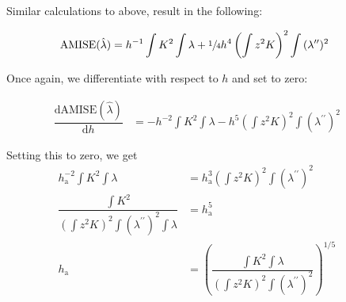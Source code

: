 Similar calculations to above, result in the following:

\begin{align}
\mbox{AMISE}(\hat{\lambda}) & = h^{-1} \int{K^2}\int{\lambda} + \sfrac{1}{4}h^4\left(\int{z^2K}\right)^2 \int{ (\lambda^{\prime\prime})^2 } && \label{eq:AMISE_I}
\end{align}

Once again, we differentiate with respect to $h$ and set to zero:

\begin{align}
\dfrac{\mathrm{d}\mbox{AMISE}(\hat{\lambda})}{\mathrm{d}h} & = - h^{-2} \int{K^2}\int{\lambda} - h^5\left(\int{z^2K}\right)^2 \int{ (\lambda^{\prime\prime})^2 } &&
\end{align}

Setting this to zero, we get 
\begin{align}
h_{\mbox{a}}^{-2} \int{K^2} \int{\lambda} & = h_{\mbox{a}}^3 \left(\int{z^2K}\right)^2 \int{ (\lambda^{\prime\prime})^2 } && \nonumber \\
\dfrac{\int{K^2}}{\left(\int{z^2K}\right)^2 \int{ (\lambda^{\prime\prime})^2 \int{\lambda} }} & = h_{\mbox{a}}^5 && \nonumber \\
h_{\mbox{a}} & = \left( \dfrac{\int{K^2} \int{\lambda}}{\left(\int{z^2K}\right)^2 \int{ (\lambda^{\prime\prime})^2 }} \right)^{1/5} && \label{eq:H_AMISE}
\end{align}